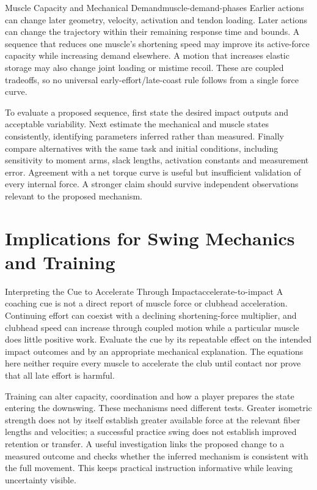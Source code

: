 \begin{principle}{Muscle Capacity and Mechanical Demand}{muscle-demand-phases}
Earlier actions can change later geometry, velocity, activation and tendon loading. Later actions can change the trajectory within their remaining response time and bounds. A sequence that reduces one muscle's shortening speed may improve its active-force capacity while increasing demand elsewhere. A motion that increases elastic storage may also change joint loading or mistime recoil. These are coupled tradeoffs, so no universal early-effort/late-coast rule follows from a single force curve.
\end{principle}

To evaluate a proposed sequence, first state the desired impact outputs and acceptable variability. Next estimate the mechanical and muscle states consistently, identifying parameters inferred rather than measured. Finally compare alternatives with the same task and initial conditions, including sensitivity to moment arms, slack lengths, activation constants and measurement error. Agreement with a net torque curve is useful but insufficient validation of every internal force. A stronger claim should survive independent observations relevant to the proposed mechanism.

\section{Implications for Swing Mechanics and Training}

\begin{principle}{Interpreting the Cue to Accelerate Through Impact}{accelerate-to-impact}
A coaching cue is not a direct report of muscle force or clubhead acceleration. Continuing effort can coexist with a declining shortening-force multiplier, and clubhead speed can increase through coupled motion while a particular muscle does little positive work. Evaluate the cue by its repeatable effect on the intended impact outcomes and by an appropriate mechanical explanation. The equations here neither require every muscle to accelerate the club until contact nor prove that all late effort is harmful.
\end{principle}

Training can alter capacity, coordination and how a player prepares the state entering the downswing. These mechanisms need different tests. Greater isometric strength does not by itself establish greater available force at the relevant fiber lengths and velocities; a successful practice swing does not establish improved retention or transfer. A useful investigation links the proposed change to a measured outcome and checks whether the inferred mechanism is consistent with the full movement. This keeps practical instruction informative while leaving uncertainty visible.

